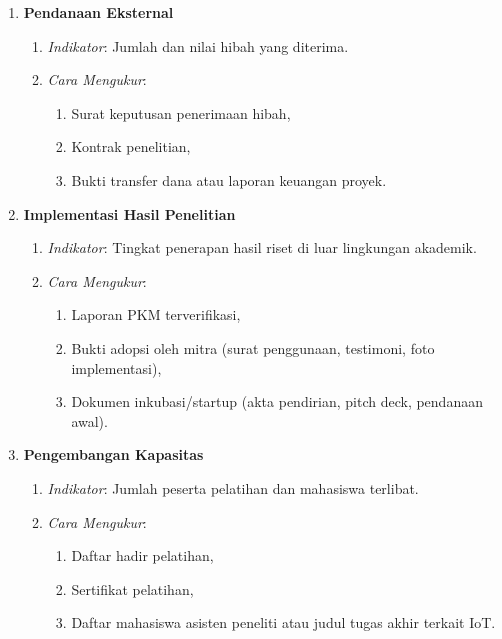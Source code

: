 \documentclass[12pt,a4paper]{article}
\begin{document}
\begin{enumerate}[leftmargin=*]
    \item \textbf{Pendanaan Eksternal}
          \begin{enumerate}
              \item \textit{Indikator}: Jumlah dan nilai hibah yang diterima.
              \item \textit{Cara Mengukur}:
                    \begin{enumerate}
                        \item Surat keputusan penerimaan hibah,
                        \item Kontrak penelitian,
                        \item Bukti transfer dana atau laporan keuangan proyek.
                    \end{enumerate}
          \end{enumerate}

    \item \textbf{Implementasi Hasil Penelitian}
          \begin{enumerate}
              \item \textit{Indikator}: Tingkat penerapan hasil riset di luar lingkungan akademik.
              \item \textit{Cara Mengukur}:
                    \begin{enumerate}
                        \item Laporan PKM terverifikasi,
                        \item Bukti adopsi oleh mitra (surat penggunaan, testimoni, foto implementasi),
                        \item Dokumen inkubasi/startup (akta pendirian, pitch deck, pendanaan awal).
                    \end{enumerate}
          \end{enumerate}

    \item \textbf{Pengembangan Kapasitas}
          \begin{enumerate}
              \item \textit{Indikator}: Jumlah peserta pelatihan dan mahasiswa terlibat.
              \item \textit{Cara Mengukur}:
                    \begin{enumerate}
                        \item Daftar hadir pelatihan,
                        \item Sertifikat pelatihan,
                        \item Daftar mahasiswa asisten peneliti atau judul tugas akhir terkait IoT.
                    \end{enumerate}
          \end{enumerate}
\end{enumerate}
\end{document}

